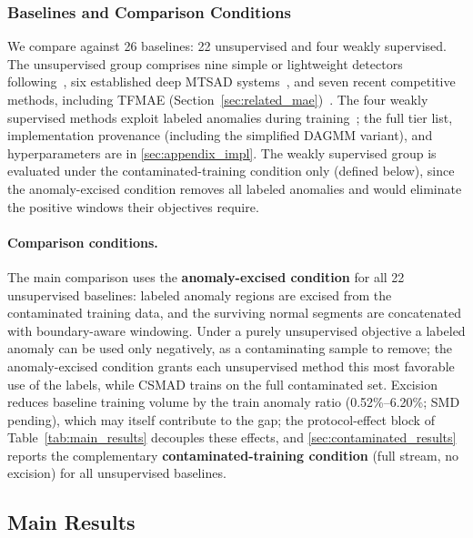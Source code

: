 \subsubsection{Baselines and Comparison Conditions}
\label{sec:baselines}

We compare against 26 baselines: 22 unsupervised and four weakly supervised.
The unsupervised group comprises nine simple or lightweight detectors following~\cite{sarfraz2024quovadis}, six established deep MTSAD systems~\cite{xu2022anomalytransformer,tuli2022tranad,audibert2020usad,zong2018dagmm,deng2021gdn,su2019omnianomaly}, and seven recent competitive methods, including TFMAE (Section~\ref{sec:related_mae})~\cite{fang2024tfmae,lai2023npsr,wu2023timesnet,yang2023dcdetector,song2023memto,luo2024moderntcn,wu2025catch}.
The four weakly supervised methods exploit labeled anomalies during training~\cite{sultani2018deepmil,lee2021wetas,liu2024treemil,wang2025nrdetector}; the full tier list, implementation provenance (including the simplified DAGMM variant), and hyperparameters are in \ref{sec:appendix_impl}.
The weakly supervised group is evaluated under the contaminated-training condition only (defined below), since the anomaly-excised condition removes all labeled anomalies and would eliminate the positive windows their objectives require.

\paragraph{Comparison conditions.}
The main comparison uses the \textbf{anomaly-excised condition} for all 22 unsupervised
baselines: labeled anomaly regions are excised from the contaminated training data, and the
surviving normal segments are concatenated with boundary-aware windowing.
Under a purely unsupervised objective a labeled anomaly can be used only negatively, as a
contaminating sample to remove; the anomaly-excised condition grants each unsupervised method this
most favorable use of the labels, while CSMAD trains on the full contaminated set.
Excision reduces baseline training volume by the train anomaly ratio (0.52\%--6.20\%; SMD
pending), which may itself contribute to the gap; the protocol-effect block of
Table~\ref{tab:main_results} decouples these effects, and \ref{sec:contaminated_results} reports
the complementary \textbf{contaminated-training condition} (full stream, no excision) for all
unsupervised baselines.

\subsection{Main Results}
\label{sec:main_results}

